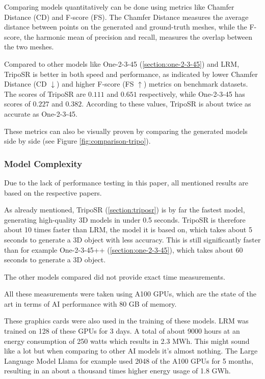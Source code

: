 Comparing models quantitatively can be done using metrics like Chamfer Distance (CD) and F-score (FS). The Chamfer Distance measures the average distance between points on the generated and ground-truth meshes, while the F-score, the harmonic mean of precision and recall, measures the overlap between the two meshes.

Compared to other models like One-2-3-45 (\ref{section:one-2-3-45}) and LRM, TripoSR is better in both speed and performance, as indicated by lower Chamfer Distance (CD \(\downarrow\)) and higher F-score (FS \(\uparrow\)) metrics on benchmark datasets. The scores of TripoSR are \(0.111\) and \(0.651\) respectively, while One-2-3-45 has scores of \(0.227\) and \(0.382\).
According to these values, TripoSR is about twice as accurate as One-2-3-45.

These metrics can also be visually proven by comparing the generated models side by side (see Figure \ref{fig:comparison-tripo}).

\subsubsection{Model Complexity}
Due to the lack of performance testing in this paper, all mentioned results are based on the respective papers.

As already mentioned, TripoSR (\ref{section:triposr}) is by far the fastest model, generating high-quality 3D models in under 0.5 seconds.
TripoSR is therefore about 10 times faster than LRM, the model it is based on, which takes about 5 seconds to generate a 3D object with less accuracy.
This is still significantly faster than for example One-2-3-45++ (\ref{section:one-2-3-45}), which takes about 60 seconds to generate a 3D object.

The other models compared did not provide exact time measurements.

All these measurements were taken using A100 GPUs, which are the state of the art in terms of AI performance with 80 GB of memory.

These graphics cards were also used in the training of these models. LRM was trained on 128 of these GPUs for 3 days.
A total of about 9000 hours at an energy consumption of 250 watts which results in 2.3 MWh. This might sound like a lot but when comparing to other AI models it's almost nothing.
The Large Language Model Llama \autocite{touvron_llama_2023} for example used 2048 of the A100 GPUs for 5 months, resulting in an about a thousand times higher energy usage of 1.8 GWh.

